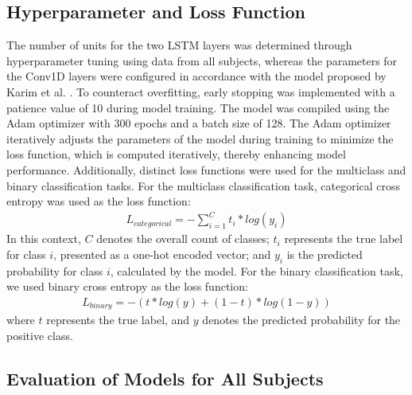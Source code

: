 \documentclass{ieeeaccess}
\begin{document}
\subsection{Hyperparameter and Loss Function}
The number of units for the two LSTM layers was determined through hyperparameter tuning using data from all subjects, whereas the parameters for the Conv1D layers were configured in accordance with the model proposed by Karim et al. \cite{Karim_2017}. To counteract overfitting, early stopping was implemented with a patience value of 10 during model training. The model was compiled using the Adam optimizer \cite{Kingma_2014} with 300 epochs and a batch size of 128. The Adam optimizer iteratively adjusts the parameters of the model during training to minimize the loss function, which is computed iteratively, thereby enhancing model performance. Additionally, distinct loss functions were used for the multiclass and binary classification tasks. For the multiclass classification task, categorical cross entropy was used as the loss function:
\begin{align}
    L_{categorical} = -\sum_{i=1}^{C}t_i*log(y_i)
\end{align}
In this context, $C$ denotes the overall count of classes; $t_i$ represents the true label for class $i$, presented as a one-hot encoded vector; and $y_i$ is the predicted probability for class $i$, calculated by the model. For the binary classification task, we used binary cross entropy as the loss function: 
\begin{align}
    L_{binary} = -(t * log(y) + (1 - t) * log(1 - y))
\end{align}
where $t$ represents the true label, and $y$ denotes the predicted probability for the positive class.

\subsection{Evaluation of Models for All Subjects}
\end{document}
